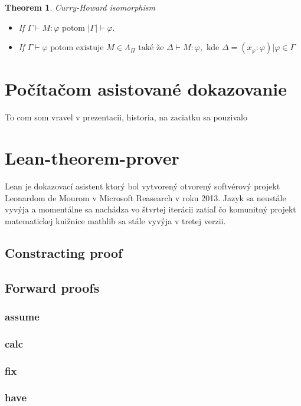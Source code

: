 \documentclass[a4paper,10pt,oneside]{report}%
\newtheorem{theorem}{Theorem}
\begin{document}
\begin{theorem}{Curry-Howard isomorphism}
    \begin{itemize}
        \item If $\Gamma \vdash M : \varphi \textrm{ potom } |\Gamma|  \vdash \varphi.$
        \item If $\Gamma \vdash \varphi \textrm{ potom existuje } M \in \Lambda_{\Pi}
            \textrm{ také že } \Delta \vdash M : \varphi, \textrm{ kde }
            \Delta = { ( x_{\varphi} : \varphi ) | \varphi \in \Gamma }$
    \end{itemize}
\end{theorem}

\section{Počítačom asistované dokazovanie}
    To com som vravel v prezentacii, historia, na zaciatku sa pouzivalo
\section{Lean-theorem-prover}
    Lean je dokazovací asistent ktorý bol vytvorený otvorený softvérový projekt
Leonardom de Mourom v Microsoft Reasearch v roku 2013. Jazyk sa neustále vyvýja
a momentálne sa nachádza vo štvrtej iterácii zatiaľ čo komunitný projekt matematickej
knižnice mathlib sa stále vyvýja v tretej verzii.
\subsection{Constracting proof}

\subsection{Forward proofs}
    \subsubsection{assume}
    \subsubsection{calc}
    \subsubsection{fix}
    \subsubsection{have}
\end{document}
